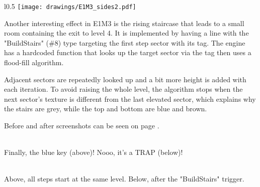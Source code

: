 \par
\begin{wrapfigure}[23]{l}{0.5\textwidth}
\centering
\texttt{[image: drawings/E1M3\_sides2.pdf]}
\end{wrapfigure}
Another interesting effect in E1M3 is the rising staircase that leads to a small room containing the exit to level 4. It is implemented by having a line with the "BuildStairs" (\#8) type targeting the first step sector with its tag. The engine has a hardcoded  function that looks up the target sector via the tag then uses a flood-fill algorithm.\\
\par Adjacent sectors are repeatedly looked up and a bit more height is added with each iteration. To avoid raising the whole level, the algorithm stops when the next sector's texture is different from the last elevated sector, which explains why the stairs are grey, while the top and bottom are blue and brown.\\
\par
Before and after screenshots can be seen on page \pageref{stairs}.


 \label{e1m3_trap} \\
Finally, the blue key (above)! Nooo, it's a TRAP (below)!

\vspace{2mm}
 \label{stairs} \\
Above, all steps start at the same level. Below, after the "BuildStairs" trigger. 

\vspace{2mm}



